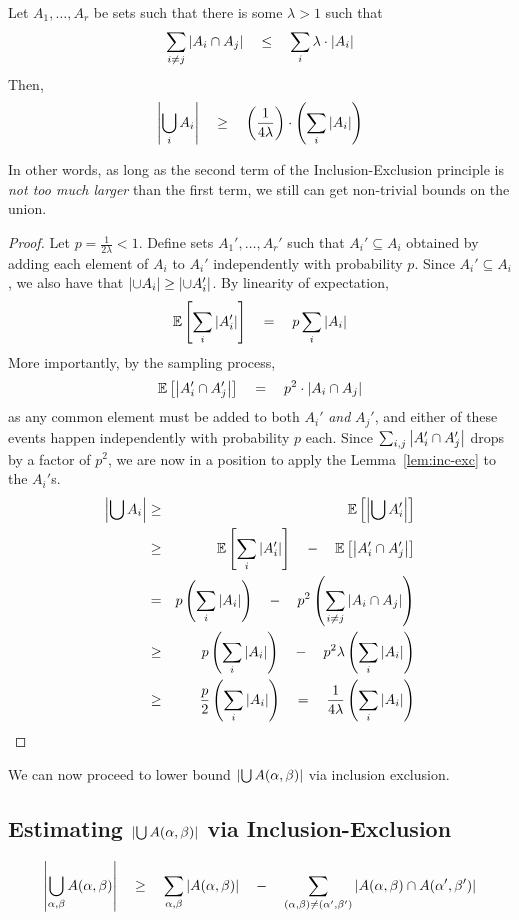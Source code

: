 \begin{lemma}\label{lem:str-inc-exc}
Let $A_1,\dots, A_r$ be sets such that there is some $\lambda > 1$ such that
\[
\sum_{i\neq j} \left|A_i \cap A_j\right| \quad \leq \quad \sum_i \lambda \cdot \left|A_i\right|
\]
Then, 
\[
\left|\bigcup_i A_i\right| \quad \geq \quad \left(\frac{1}{4\lambda}\right) \cdot \left(\sum_i \left|A_i\right|\right)
\]
\end{lemma}

In other words, as long as the second term of the Inclusion-Exclusion principle is \emph{not too much larger} than the first term, we still can get non-trivial bounds on the union. 

\begin{proof}
Let $p = \frac{1}{2\lambda} < 1$. Define sets $A_1',\dots, A_r'$ such that $A_i' \subseteq A_i$ obtained by adding each element of $A_i$ to $A_i'$ independently with probability $p$. Since $A_i' \subseteq A_i$, we also have that $\left|\cup A_i\right| \geq \left|\cup  A_i'\right|$. By linearity of expectation, 
\[
\mathbb{E}\left[\sum_i \left|A_i'\right|\right] \quad = \quad p \sum_{i} \left|A_i\right| 
\]
More importantly, by the sampling process,
\[
\mathbb{E}\left[\left|A_i' \cap A_j'\right|\right] \quad = \quad p^2 \cdot \left|A_i \cap A_j\right|
\]
as any common element must be added to both $A_i'$ \emph{and} $A_j'$, and either of these events happen independently with probability $p$ each. Since $\sum_{i,j}\left|A_i' \cap A_j'\right|$ drops by a factor of $p^2$, we are now in a position to apply the Lemma~\ref{lem:inc-exc} to the $A_i'$s. 
\begin{eqnarray*}
\left|\bigcup A_i\right| & \geq &  \mathbb{E}\left[\left|\bigcup A_i'\right|\right]\\
& \geq & \mathbb{E}\left[\sum_i \left|A_i'\right|\right] \quad - \quad \mathbb{E}\left[\left|A_i' \cap A_j'\right|\right]\\
& = & p \left(\sum_i \left|A_i\right|\right) \quad - \quad p^2\left(\sum_{i\neq j}\left|A_i \cap A_j\right|\right)\\
& \geq & p \left(\sum_i \left|A_i\right|\right) \quad - \quad p^2 \lambda \left(\sum_i \left|A_i\right|\right)\\
& \geq & \frac{p}{2} \left(\sum_i \left|A_i\right|\right) \quad = \quad \frac{1}{4\lambda} \left(\sum_i \left|A_i\right|\right)
\end{eqnarray*}
\end{proof}

We can now proceed to lower bound $\left|\bigcup A(\alpha, \beta)\right|$ via inclusion exclusion.

\subsection*{Estimating $\left|\bigcup A(\alpha, \beta)\right|$ via Inclusion-Exclusion}
\[
\left|\bigcup_{\alpha, \beta}A(\alpha,\beta)\right|\quad \geq \quad \sum_{\alpha,\beta}\left|A(\alpha, \beta)\right| \quad - \quad \sum_{(\alpha, \beta)\neq (\alpha',\beta')}\left|A(\alpha, \beta) \cap A(\alpha',\beta')\right|
\]

